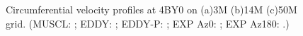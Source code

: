 \begin{figure}[t]
     \caption{Circumferential velocity profiles at 4BY0 on (a)3M (b)14M (c)50M grid. (MUSCL: \mline; EDDY: \eline; EDDY-P: \epline; EXP Az0: \bluecrx; EXP Az180: \redcrx.)}
     \label{v}    
\end{figure}
